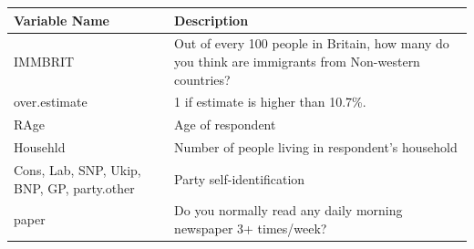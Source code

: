 \documentclass[]{article}
\begin{document}
\begin{longtable}[]{@{}ll@{}}
\toprule
\begin{minipage}[b]{0.11\columnwidth}\raggedright
Variable Name\strut
\end{minipage} & \begin{minipage}[b]{0.83\columnwidth}\raggedright
Description\strut
\end{minipage}\tabularnewline
\midrule
\endhead
\begin{minipage}[t]{0.11\columnwidth}\raggedright
IMMBRIT\strut
\end{minipage} & \begin{minipage}[t]{0.83\columnwidth}\raggedright
Out of every 100 people in Britain, how many do you think are immigrants from Non-western countries?\strut
\end{minipage}\tabularnewline
\begin{minipage}[t]{0.11\columnwidth}\raggedright
over.estimate\strut
\end{minipage} & \begin{minipage}[t]{0.83\columnwidth}\raggedright
1 if estimate is higher than 10.7\%.\strut
\end{minipage}\tabularnewline
\begin{minipage}[t]{0.11\columnwidth}\raggedright
RAge\strut
\end{minipage} & \begin{minipage}[t]{0.83\columnwidth}\raggedright
Age of respondent\strut
\end{minipage}\tabularnewline
\begin{minipage}[t]{0.11\columnwidth}\raggedright
Househld\strut
\end{minipage} & \begin{minipage}[t]{0.83\columnwidth}\raggedright
Number of people living in respondent's household\strut
\end{minipage}\tabularnewline
\begin{minipage}[t]{0.11\columnwidth}\raggedright
Cons, Lab, SNP, Ukip, BNP, GP, party.other\strut
\end{minipage} & \begin{minipage}[t]{0.83\columnwidth}\raggedright
Party self-identification\strut
\end{minipage}\tabularnewline
\begin{minipage}[t]{0.11\columnwidth}\raggedright
paper\strut
\end{minipage} & \begin{minipage}[t]{0.83\columnwidth}\raggedright
Do you normally read any daily morning newspaper 3+ times/week?\strut

\end{minipage}
\end{longtable}
\end{document}
